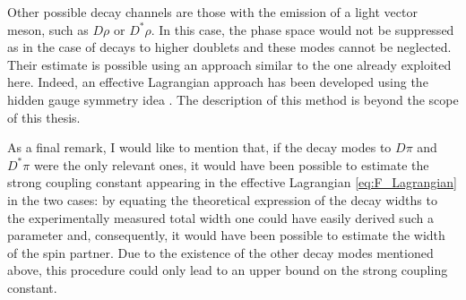 Other possible decay channels are those with the emission of a light vector meson, such as $D \rho$ or $D^* \rho$. In this case, the phase space would not be suppressed as in the case of decays to higher doublets and these modes cannot be neglected. Their estimate is possible using an approach similar to the one already exploited here. Indeed, an effective Lagrangian approach has been developed using the hidden gauge symmetry idea \cite{Bando:1985rf,Bando:1987br}. The description of this method is beyond the scope of this thesis. 

As a final remark, I would like to mention that, if the decay modes to $D\pi$ and $D^* \pi$ were the only relevant ones, it would have been possible to estimate the strong coupling constant appearing in the effective Lagrangian \eqref{eq:F_Lagrangian} in the two cases: by equating the theoretical expression of the decay widths to the experimentally measured total width one could have easily derived such a parameter and, consequently, it would have been possible to estimate the width of the spin partner. Due to the existence of the other decay modes mentioned above, this procedure could only lead to an upper bound on the strong coupling constant.

